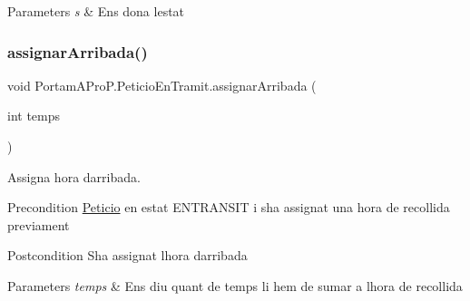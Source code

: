 \begin{DoxyParams}{Parameters}
{\em s} & Ens dona l\textquotesingle{}estat \\
\hline
\end{DoxyParams}
\mbox{\label{class_portam_a_pro_p_1_1_peticio_en_tramit_a59f97f6f782df87cf5e8df14859d966f}} 
\subsubsection{\texorpdfstring{assignar\+Arribada()}{assignarArribada()}}
{\footnotesize\ttfamily void Portam\+A\+Pro\+P.\+Peticio\+En\+Tramit.\+assignar\+Arribada (\begin{DoxyParamCaption}\item[{int}]{temps }\end{DoxyParamCaption})}



Assigna hora d\textquotesingle{}arribada. 

\begin{DoxyPrecond}{Precondition}
\hyperlink{class_portam_a_pro_p_1_1_peticio}{Peticio} en estat E\+N\+T\+R\+A\+N\+S\+IT i s\textquotesingle{}ha assignat una hora de recollida previament 
\end{DoxyPrecond}
\begin{DoxyPostcond}{Postcondition}
S\textquotesingle{}ha assignat l\textquotesingle{}hora d\textquotesingle{}arribada 
\end{DoxyPostcond}

\begin{DoxyParams}{Parameters}
{\em temps} & Ens diu quant de temps li hem de sumar a l\textquotesingle{}hora de recollida \\
\hline
\end{DoxyParams}
\mbox{\label{class_portam_a_pro_p_1_1_peticio_en_tramit_a4a8abd30d88ea34909b4cb464ffb7c42}} 
